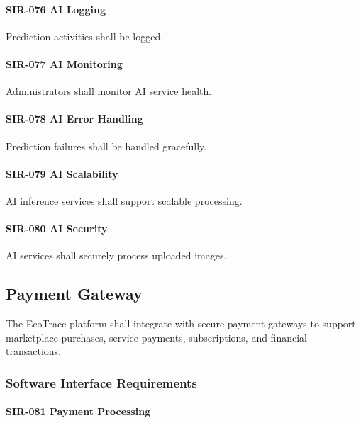 \paragraph{SIR-076 AI Logging}

Prediction activities shall be logged.

\paragraph{SIR-077 AI Monitoring}

Administrators shall monitor AI service health.

\paragraph{SIR-078 AI Error Handling}

Prediction failures shall be handled gracefully.

\paragraph{SIR-079 AI Scalability}

AI inference services shall support scalable processing.

\paragraph{SIR-080 AI Security}

AI services shall securely process uploaded images.


\subsection{Payment Gateway}

The EcoTrace platform shall integrate with secure payment gateways to
support marketplace purchases, service payments, subscriptions, and
financial transactions.


\subsubsection*{Software Interface Requirements}

\paragraph{SIR-081 Payment Processing}

